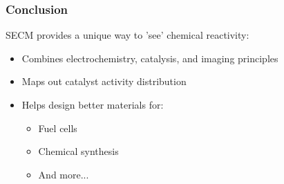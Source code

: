 \documentclass{beamer}
\begin{document}
\begin{frame}
\frametitle{Conclusion}
SECM provides a unique way to 'see' chemical reactivity:
\begin{itemize}
    \item Combines electrochemistry, catalysis, and imaging principles
    \item Maps out catalyst activity distribution
    \item Helps design better materials for:
    \begin{itemize}
        \item Fuel cells
        \item Chemical synthesis
        \item And more...
    \end{itemize}
\end{itemize}
\end{frame}
\end{document}
